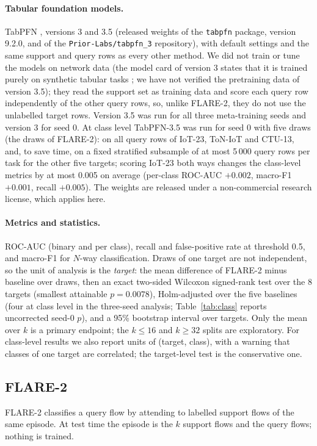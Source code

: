 \documentclass[11pt]{article}
\begin{document}
\paragraph{Tabular foundation models.}
TabPFN \citep[the family of][]{hollmann2025tabpfn}, versions 3 and 3.5 (released weights of the \texttt{tabpfn} package, version 9.2.0, and of the \texttt{Prior-Labs/tabpfn\_3} repository), with default settings and the same support and query rows as every other method.
We did not train or tune the models on network data (the model card of version 3 states that it is trained purely on synthetic tabular tasks \citep{priorlabs2026tabpfn3}; we have not verified the pretraining data of version 3.5); they read the support set as training data and score each query row independently of the other query rows, so, unlike FLARE-2, they do not use the unlabelled target rows.
Version 3.5 was run for all three meta-training seeds and version 3 for seed 0.
At class level TabPFN-3.5 was run for seed 0 with five draws (the draws of FLARE-2): on all query rows of IoT-23, ToN-IoT and CTU-13, and, to save time, on a fixed stratified subsample of at most 5\,000 query rows per task for the other five targets; scoring IoT-23 both ways changes the class-level metrics by at most 0.005 on average (per-class ROC-AUC $+0.002$, macro-F1 $+0.001$, recall $+0.005$).
The weights are released under a non-commercial research license, which applies here.
\paragraph{Metrics and statistics.}
ROC-AUC (binary and per class), recall and false-positive rate at threshold 0.5, and macro-F1 for $N$-way classification.
Draws of one target are not independent, so the unit of analysis is the \emph{target}: the mean difference of FLARE-2 minus baseline over draws, then an exact two-sided Wilcoxon signed-rank test over the 8 targets (smallest attainable $p=0.0078$), Holm-adjusted over the five baselines (four at class level in the three-seed analysis; Table~\ref{tab:class} reports uncorrected seed-0 $p$), and a 95\% bootstrap interval over targets. Only the mean over $k$ is a primary endpoint; the $k\le16$ and $k\ge32$ splits are exploratory.
For class-level results we also report units of (target, class), with a warning that classes of one target are correlated; the target-level test is the conservative one.

\subsection{FLARE-2}\label{sec:method}
FLARE-2 classifies a query flow by attending to labelled support flows of the same episode.
At test time the episode is the $k$ support flows and the query flows; nothing is trained.
\end{document}
